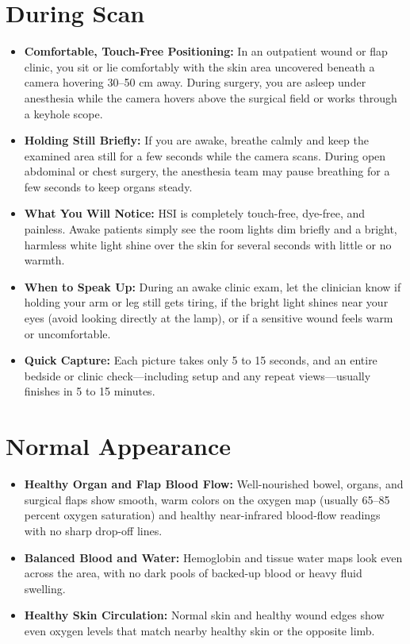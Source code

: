\section{During Scan}
\begin{itemize}
    \item \textbf{Comfortable, Touch-Free Positioning:} In an outpatient wound or flap clinic, you sit or lie comfortably with the skin area uncovered beneath a camera hovering 30--50 cm away. During surgery, you are asleep under anesthesia while the camera hovers above the surgical field or works through a keyhole scope.
    \item \textbf{Holding Still Briefly:} If you are awake, breathe calmly and keep the examined area still for a few seconds while the camera scans. During open abdominal or chest surgery, the anesthesia team may pause breathing for a few seconds to keep organs steady.
    \item \textbf{What You Will Notice:} HSI is completely touch-free, dye-free, and painless. Awake patients simply see the room lights dim briefly and a bright, harmless white light shine over the skin for several seconds with little or no warmth.
    \item \textbf{When to Speak Up:} During an awake clinic exam, let the clinician know if holding your arm or leg still gets tiring, if the bright light shines near your eyes (avoid looking directly at the lamp), or if a sensitive wound feels warm or uncomfortable.
    \item \textbf{Quick Capture:} Each picture takes only 5 to 15 seconds, and an entire bedside or clinic check---including setup and any repeat views---usually finishes in 5 to 15 minutes.
\end{itemize}

\section{Normal Appearance}
\begin{itemize}
    \item \textbf{Healthy Organ and Flap Blood Flow:} Well-nourished bowel, organs, and surgical flaps show smooth, warm colors on the oxygen map (usually 65--85 percent oxygen saturation) and healthy near-infrared blood-flow readings with no sharp drop-off lines.
    \item \textbf{Balanced Blood and Water:} Hemoglobin and tissue water maps look even across the area, with no dark pools of backed-up blood or heavy fluid swelling.
    \item \textbf{Healthy Skin Circulation:} Normal skin and healthy wound edges show even oxygen levels that match nearby healthy skin or the opposite limb.
\end{itemize}

